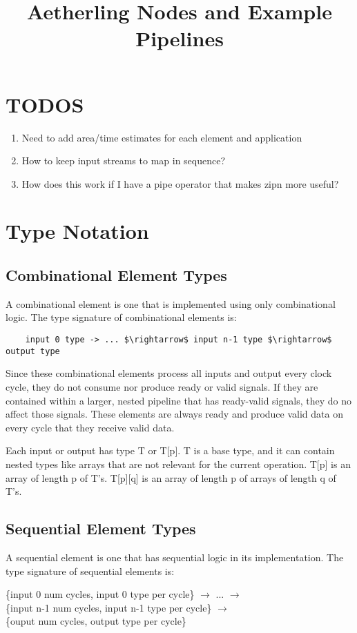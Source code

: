 \documentclass[11pt,fleqn]{article}
\numberwithin{equation}{subsection}
\begin{document}
\title{Aetherling Nodes and Example Pipelines}

\section{TODOS}
\begin{enumerate}
    \item Need to add area/time estimates for each element and application
    \item How to keep input streams to map in sequence?
    \item How does this work if I have a pipe operator that makes zipn more useful?
\end{enumerate}

\section{Type Notation}

\subsection{Combinational Element Types}
A combinational element is one that is implemented using only combinational logic.
The type signature of combinational elements is:
\begin{lstlisting}
    input 0 type -> ... $\rightarrow$ input n-1 type $\rightarrow$ output type
\end{lstlisting}
Since these combinational elements process all inputs and output every 
clock cycle, they do not consume nor produce ready or valid signals. If they
are contained within a larger, nested pipeline that has ready-valid signals,
they do no affect those signals. These elements are always ready and produce 
valid data on every cycle that they receive valid data.

Each input or output has type T or T[p]. T is a base type, and it can contain 
nested types like arrays that are not relevant for the current operation. T[p] 
is an array of length p of T's. T[p][q] is an array of length p of arrays of 
length q of T's.

\subsection{Sequential Element Types}
A sequential element is one that has sequential logic in its implementation.
The type signature of sequential elements is:
\begin{adjustwidth}{2.5 em}{0 pt}
    \{input 0 num cycles, input 0 type per cycle\} $\rightarrow$ ...
    $\rightarrow$ \\
    \{input n-1 num cycles, input n-1 type per cycle\} $\rightarrow$ \\ 
    \{ouput num cycles, output type per cycle\}
\end{adjustwidth}
\end{document}
